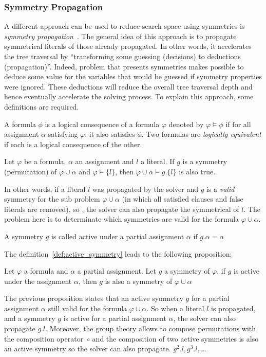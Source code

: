 \subsubsection{Symmetry Propagation}
A different approach can be used to reduce search space using symmetries is \emph{symmetry propagation}~\cite{Devriendt12}.
The general idea of this approach is to propagate symmetrical literals of those already propagated.
In other words, it accelerates the tree traversal by ``transforming some guessing (decisions) to deductions (propagation)''.
Indeed, problem that presents symmetries makes possible to deduce some value 
for the variables that would be guessed if symmetry properties were ignored.
These deductions will reduce the overall tree traversal depth and hence eventually accelerate the solving process.
To explain this approach, some definitions are required.

\begin{definition}
 \label{def:logical_consequence}
 A formula $\phi$ is a logical consequence of a formula $\varphi$ denoted by $\varphi \models \phi$ if for all assignment
 $\alpha$ satisfying $\varphi$, it also satisfies $\phi$. Two formulas are \emph{logically equivalent} if each is a logical
 consequence of the other.
\end{definition}
\begin{proposition}
 \label{prop:symmetry_propagation}
 Let $\varphi$ be a formula, $\alpha$ an assignment and $l$ a literal. 
 If $g$ is a symmetry (permutation) of $\varphi \cup \alpha$ and
 $\varphi \models \{l\}$, then $\varphi \cup \alpha \models g.\{l\}$ is also true.
\end{proposition}
In other words, if a literal $l$ was propagated by the solver and $g$ is a \emph{valid} symmetry for the
sub problem $\varphi \cup \alpha$ (in which all satisfied clauses and false literals are removed), so , the solver can
also propagate the symmetrical of $l$. The problem here is to determinate which symmetries are valid for the formula
$\varphi \cup \alpha$.
\begin{definition}
 \label{def:active_symmetry}
 A symmetry $g$ is called active under a partial assignment $\alpha$ $\text{if } g.\alpha = \alpha$
\end{definition}
The definition~\ref{def:active_symmetry} leads to the following proposition:
\begin{proposition}
 \label{prop:active_symmetry}
 Let $\varphi$ a formula and $\alpha$ a partial assignment. Let $g$ a symmetry of $\varphi$,
 if $g$ is active under the assignment $\alpha$, then $g$ is also a symmetry of $\varphi \cup \alpha$
\end{proposition}
The previous proposition states that an active symmetry $g$ for a partial assignment $\alpha$ still valid for
the formula $\varphi \cup \alpha$. So when a literal $l$ is propagated, and a symmetry $g$ is active for a
partial assignment $\alpha$, the solver can also propagate $g.l$. 
Moreover, the group theory allows to compose permutations with the composition operator~$\circ$ and the composition of two active symmetries is also an active symmetry so the solver can also propagate. $g^2.l, g^3.l, ... $

